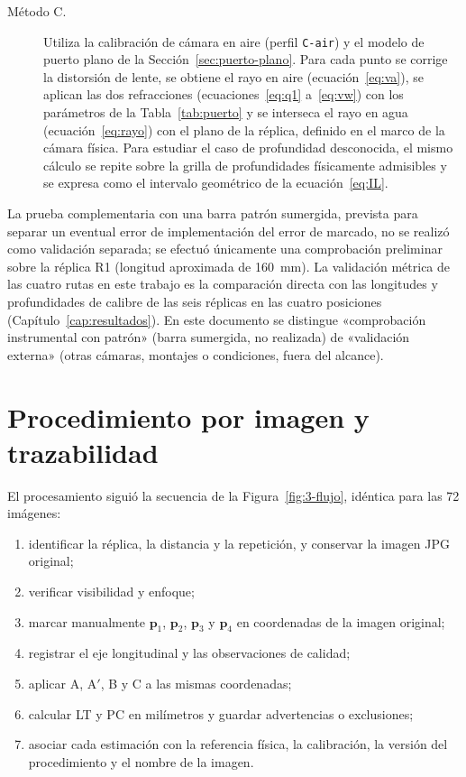 \documentclass{report}
\newcommand{\Aprime}{A$'$}
\begin{document}
\begin{description}
  \item[Método C.] Utiliza la calibración de cámara en aire (perfil \texttt{C-air}) y el modelo de puerto plano de la Sección~\ref{sec:puerto-plano}. Para cada punto se corrige la distorsión de lente, se obtiene el rayo en aire (ecuación~\ref{eq:va}), se aplican las dos refracciones (ecuaciones~\ref{eq:q1} a~\ref{eq:vw}) con los parámetros de la Tabla~\ref{tab:puerto} y se interseca el rayo en agua (ecuación~\ref{eq:rayo}) con el plano de la réplica, definido en el marco de la cámara física. Para estudiar el caso de profundidad desconocida, el mismo cálculo se repite sobre la grilla de profundidades físicamente admisibles y se expresa como el intervalo geométrico de la ecuación~\eqref{eq:IL}.
\end{description}

La prueba complementaria con una barra patrón sumergida, prevista para separar un eventual error de implementación del error de marcado, no se realizó como validación separada; se efectuó únicamente una comprobación preliminar sobre la réplica R1 (longitud aproximada de 160~mm). La validación métrica de las cuatro rutas en este trabajo es la comparación directa con las longitudes y profundidades de calibre de las seis réplicas en las cuatro posiciones (Capítulo~\ref{cap:resultados}). En este documento se distingue «comprobación instrumental con patrón» (barra sumergida, no realizada) de «validación externa» (otras cámaras, montajes o condiciones, fuera del alcance).

\section{Procedimiento por imagen y trazabilidad}
\label{sec:procedimiento}

El procesamiento siguió la secuencia de la Figura~\ref{fig:3-flujo}, idéntica para las 72 imágenes:

\begin{enumerate}
  \item identificar la réplica, la distancia y la repetición, y conservar la imagen JPG original;
  \item verificar visibilidad y enfoque;
  \item marcar manualmente $\mathbf{p}_1$, $\mathbf{p}_2$, $\mathbf{p}_3$ y $\mathbf{p}_4$ en coordenadas de la imagen original;
  \item registrar el eje longitudinal y las observaciones de calidad;
  \item aplicar A, \Aprime, B y C a las mismas coordenadas;
  \item calcular LT y PC en milímetros y guardar advertencias o exclusiones;
  \item asociar cada estimación con la referencia física, la calibración, la versión del procedimiento y el nombre de la imagen.
\end{enumerate}
\end{document}
